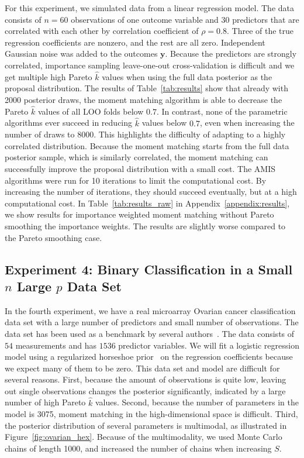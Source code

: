 \documentclass[12pt]{article}
\begin{document}
For this experiment,
we simulated data from a linear regression model. 
The data consists of $n = 60$ observations of one outcome variable 
and $30$ predictors that are correlated with each other by correlation coefficient
of $\rho = 0.8$. Three of the true regression coefficients are nonzero, and the rest are all zero. Independent Gaussian noise was added to the outcomes $\mathbf{y}$.
Because the predictors are strongly correlated, importance sampling leave-one-out cross-validation is
difficult and we get multiple high Pareto $\hat{k}$ values when using
the full data posterior as the proposal distribution.
%
%
%
%
The results of Table~\ref{tab:results} show that
already with 2000 posterior draws, the moment matching algorithm
is able to decrease the Pareto $\hat{k}$ values of all LOO folds below $0.7$.
In contrast, none of the parametric algorithms ever succeed in reducing $\hat{k}$ values below $0.7$,
even when increasing the number of draws to 8000.
This highlights the difficulty of adapting to a highly correlated distribution.
%
%
Because the moment matching starts from the full data posterior sample,
which is similarly correlated, the moment matching can successfully improve the proposal distribution with a small cost.
%
%
The AMIS algorithms were run for 10 iterations to limit the computational cost.
By increasing the number of iterations, they should succeed eventually,
but at a high computational cost.
In Table~\ref{tab:results_raw} in Appendix~\ref{appendix:results}, we show results for importance weighted moment
matching without Pareto smoothing the importance weights. The results are slightly worse compared
to the Pareto smoothing case.




\subsection{Experiment 4: Binary Classification in a Small $n$ Large $p$ Data Set} \label{sec:ovarian}


In the fourth experiment, we have a real microarray Ovarian cancer classification data set with a large number of
predictors and small number of observations.
The data set has been used as a benchmark by several authors~\citep[e.g.][and references]{schummer1999comparative,hernandez2010expectation}.
The data consists of $54$ measurements and has $1536$ predictor variables.
We will fit a logistic regression model
using a regularized horseshoe prior~\citep{piironen2017rhs} on the regression coefficients because
we expect many of them to be zero.
This data set and model are difficult for several reasons.
First, because
the amount of observations is quite low, leaving out single observations
changes the posterior significantly, indicated by a
large number of high Pareto $\hat{k}$ values. Second, because the number of parameters in the model is 3075,
moment matching in the high-dimensional space is difficult.
Third, the posterior distribution of several 
parameters is multimodal, as illustrated in Figure~\ref{fig:ovarian_hex}.
Because of the multimodality, we used Monte Carlo chains of length 1000, and increased the
number of chains when increasing $S$.
\end{document}

